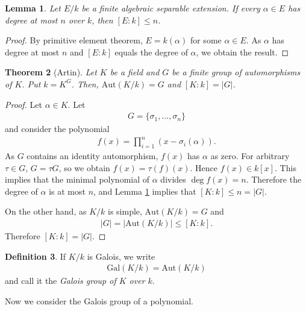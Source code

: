 \documentclass[12pt]{report}
\theoremstyle{plain}
\newtheorem{theorem}{Theorem}[section]
\newtheorem{lemma}[theorem]{Lemma}
\theoremstyle{remark}
\theoremstyle{definition}
\newtheorem{definition}[theorem]{Definition}
\begin{document}
\begin{lemma}\label{Lemma 3.12.8.}
    Let $E/k$ be a finite algebraic separable extension. If every $\alpha\in E$ has degree at most $n$ over $k$, then $[E:k]\le n$.
\end{lemma}
\begin{proof}
    By primitive element theorem, $E=k(\alpha)$ for some $\alpha\in E$. As $\alpha$ has degree at most $n$ and $[E:k]$ equals the degree of $\alpha$, we obtain the result. 
\end{proof}

\begin{theorem}[Artin]
    Let $K$ be a field and $G$ be a finite group of automorphisms of $K$. Put $k=K^G$. Then, $\mathrm{Aut}(K/k)=G$ and $[K:k]=|G|$.
\end{theorem}
\begin{proof}
    Let $\alpha\in K$. Let
    \begin{align*}
        G= \{\sigma_1,\dots,\sigma_n\}
    \end{align*}
    and consider the polynomial
    \begin{align*}
        f(x) = \prod_{i=1}^n (x-\sigma_i(\alpha)).
    \end{align*}
    As $G$ contains an identity automorphism, $f(x)$ has $\alpha$ as zero. For arbitrary $\tau\in G$, $G=\tau G$, so we obtain $f(x) = \tau(f)(x)$. Hence $f(x)\in k[x]$. This implies that the minimal polynomial of $\alpha$ divides $\deg f(x) = n$. Therefore the degree of $\alpha$ is at most $n$, and Lemma \ref{Lemma 3.12.8.} implies that $[K:k]\le n=|G|$.

    On the other hand, as $K/k$ is simple, $\mathrm{Aut}(K/k)=G$ and
    \begin{align*}
        |G| = |\mathrm{Aut}(K/k)| \le [K:k].
    \end{align*}
    Therefore $[K:k]=|G|$.
\end{proof}

\begin{definition}
    If $K/k$ is Galois, we write
    \begin{align*}
        \mathrm{Gal}(K/k)=\mathrm{Aut}(K/k)
    \end{align*}
    and call it the \emph{Galois group of $K$ over $k$}.
\end{definition}

Now we consider the Galois group of a polynomial.
\end{document}
